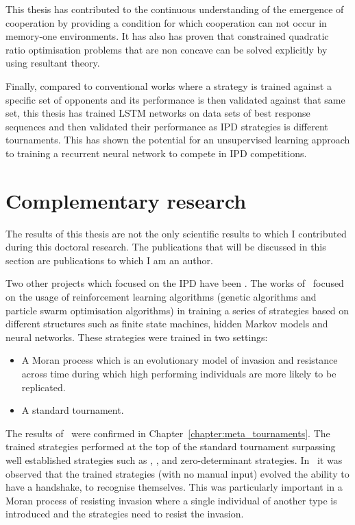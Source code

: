 This thesis has contributed to the continuous understanding of the emergence of
cooperation by providing a condition for which cooperation can not occur in
memory-one environments. It has also has proven that constrained quadratic
ratio optimisation problems that are non concave can be solved explicitly by
using resultant theory.

Finally, compared to conventional works where a strategy is trained against a
specific set of opponents and its performance is then validated against that
same set, this thesis has trained LSTM networks on data sets of best response
sequences and then validated their performance as IPD strategies is
\metatournamentslstm different tournaments. This has shown the potential for an
unsupervised learning approach to training a recurrent neural network to compete
in IPD competitions.

\section{Complementary research}

The results of this thesis are not the only scientific results to which I
contributed during this doctoral research. The publications that will be
discussed in this section are publications to which I am an author.

Two other projects which focused on the IPD have been
\cite{Knight2017, Harper2017}. The works of~\cite{Knight2017, Harper2017}
focused on the usage of reinforcement learning algorithms (genetic algorithms
and particle swarm optimisation algorithms) in training a series of strategies
based on different structures such as finite state machines, hidden Markov
models and neural networks. These strategies were trained in two settings:

\begin{itemize}
    \item A Moran process which is an evolutionary model of invasion and
    resistance across time during which high performing individuals are more
    likely to be replicated.
    \item A standard tournament.
\end{itemize}

The results of~\cite{Knight2017} were confirmed in
Chapter~\ref{chapter:meta_tournaments}. The trained strategies performed at
the top of the standard tournament surpassing well established
strategies such as \TitForTat, \Pavlov, \Gradual and zero-determinant strategies.
In~\cite{Harper2017} it was observed that the trained strategies (with no manual
input) evolved the ability to have a handshake, to recognise themselves. This
was particularly important in a Moran process of resisting invasion where a
single individual of another type is introduced and the strategies need to
resist the invasion.

